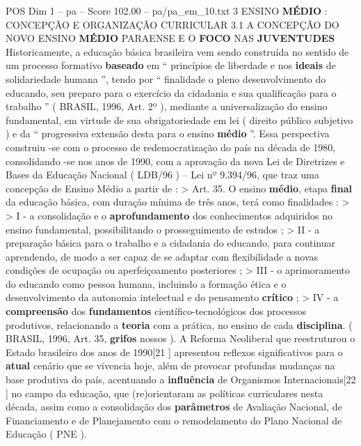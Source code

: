 \begin{textsample}{POS Dim 1 – pa – Score 102.00 – pa/pa\_em\_10.txt}  \label{ex:f1_pos_031}
3 ENSINO \textbf{MÉDIO} : CONCEPÇÃO E ORGANIZAÇÃO CURRICULAR 3.1 A CONCEPÇÃO DO NOVO ENSINO \textbf{MÉDIO} PARAENSE E O \textbf{FOCO} NAS \textbf{JUVENTUDES} Historicamente, a educação básica brasileira vem sendo construída no sentido de um processo formativo \textbf{baseado} em “ princípios de liberdade e nos \textbf{ideais} de solidariedade humana ”, tendo por “ finalidade o pleno desenvolvimento do educando, seu preparo para o exercício da cidadania e sua qualificação para o trabalho ” ( BRASIL, 1996, Art. 2º ), mediante a universalização do ensino fundamental, em virtude de sua obrigatoriedade em lei ( direito público subjetivo ) e da “ progressiva extensão desta para o ensino \textbf{médio} ”.
Essa perspectiva construiu -se com o processo de redemocratização do país na década de 1980, consolidando -se nos anos de 1990, com a aprovação da nova Lei de Diretrizes e Bases da Educação Nacional ( LDB/96 ) – Lei nº 9.394/96, que traz uma concepção de Ensino Médio a partir de : > Art. 35.
O ensino \textbf{médio}, etapa \textbf{final} da educação básica, com duração mínima de três anos, terá como finalidades : > > I - a consolidação e o \textbf{aprofundamento} dos conhecimentos adquiridos no ensino fundamental, possibilitando o prosseguimento de estudos ; > II - a preparação básica para o trabalho e a cidadania do educando, para continuar aprendendo, de modo a ser capaz de se adaptar com flexibilidade a novas condições de ocupação ou aperfeiçoamento posteriores ; > III - o aprimoramento do educando como pessoa humana, incluindo a formação ética e o desenvolvimento da autonomia intelectual e do pensamento \textbf{crítico} ; > IV - a \textbf{compreensão} dos \textbf{fundamentos} científico-tecnológicos dos processos produtivos, relacionando a \textbf{teoria} com a prática, no ensino de cada \textbf{disciplina}. ( BRASIL, 1996, Art. 35, \textbf{grifos} nossos ).
A Reforma Neoliberal que reestruturou o Estado brasileiro dos anos de 1990[21 ] apresentou reflexos significativos para o \textbf{atual} cenário que se vivencia hoje, além de provocar profundas mudanças na base produtiva do país, acentuando a \textbf{influência} de Organismos Internacionais[22 ] no campo da educação, que (re)orientaram as políticas curriculares nesta década, assim como a consolidação dos \textbf{parâmetros} de Avaliação Nacional, de Financiamento e de Planejamento com o remodelamento do Plano Nacional de Educação ( PNE ).

\end{textsample}

